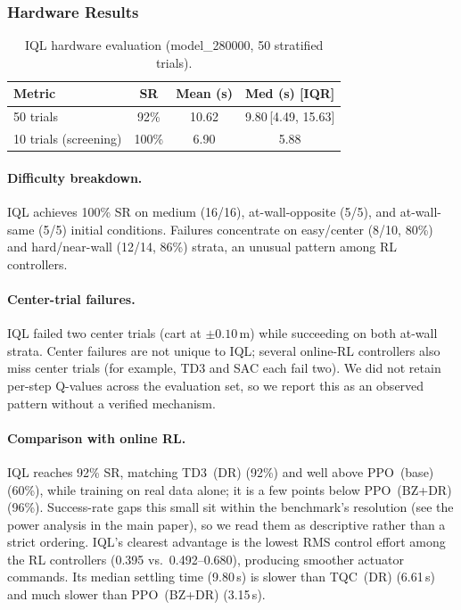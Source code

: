 \subsubsection{Hardware Results}

\begin{table}[!t]
\centering
\renewcommand{\arraystretch}{1.15}
\caption{IQL hardware evaluation (model\_280000, 50 stratified trials).}
\label{tab:iql_hw_results}
\begin{tabular}{lccc}
\toprule
\textbf{Metric} & \textbf{SR} & \textbf{Mean (s)}
  & \textbf{Med (s) [IQR]} \\
\midrule
50 trials & 92\% & 10.62 & 9.80\,[4.49, 15.63] \\
10 trials (screening) & 100\% & 6.90 & 5.88 \\
\bottomrule
\end{tabular}
\end{table}

\paragraph{Difficulty breakdown.}
IQL achieves 100\% SR on medium (16/16), at-wall-opposite (5/5),
and at-wall-same (5/5) initial conditions.
Failures concentrate on easy/center (8/10, 80\%) and hard/near-wall (12/14,
86\%) strata, an unusual pattern among RL controllers.

\paragraph{Center-trial failures.}
IQL failed two center trials (cart at $\pm 0.10$\,m) while succeeding on
both at-wall strata. Center failures are not unique to IQL; several
online-RL controllers also miss center trials (for example, TD3 and SAC
each fail two). We did not retain per-step Q-values across the evaluation
set, so we report this as an observed pattern without a verified
mechanism.

\paragraph{Comparison with online RL.}
IQL reaches 92\% SR, matching TD3~(DR) (92\%) and well above PPO~(base)
(60\%), while training on real data alone; it is a few points below
PPO~(BZ+DR) (96\%). Success-rate gaps this small sit within the
benchmark's resolution (see the power analysis in the main paper), so we
read them as descriptive rather than a strict ordering. IQL's clearest
advantage is the lowest RMS control effort among the RL controllers
(0.395 vs.\ 0.492--0.680), producing smoother actuator commands.
Its median settling time (9.80\,s) is slower than TQC~(DR)
(6.61\,s) and much slower than PPO~(BZ+DR) (3.15\,s).

